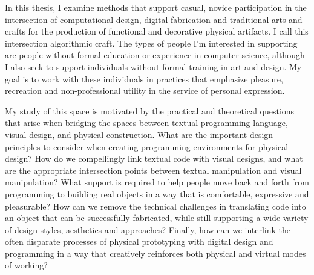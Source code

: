 
In this thesis, I examine methods that support casual, novice participation in the intersection of computational design, digital fabrication and traditional arts and crafts for the production of functional and decorative physical artifacts. I call this intersection algorithmic craft. The types of people I'm interested in supporting are people without formal education or experience in computer science, although I also seek to support individuals without formal training in art and design. My goal is to work with these individuals in practices that emphasize pleasure, recreation and non-professional utility in the service of personal expression. 

My study of this space is motivated by the practical and theoretical questions that arise when bridging the spaces between textual programming language, visual design, and physical construction. What are the important design principles to consider when creating  programming environments for physical design? How do we compellingly link textual code with visual designs, and what are the appropriate intersection points between textual manipulation and visual manipulation? What support is required to help people move back and forth from programming to building real objects in a way that is comfortable, expressive and pleasurable? How can we remove the technical challenges in translating code into an object that can be successfully fabricated, while still supporting a wide variety of design styles, aesthetics and approaches? Finally, how can we interlink the often disparate processes of physical prototyping with digital design and programming in a way that creatively reinforces both physical and virtual modes of working?

